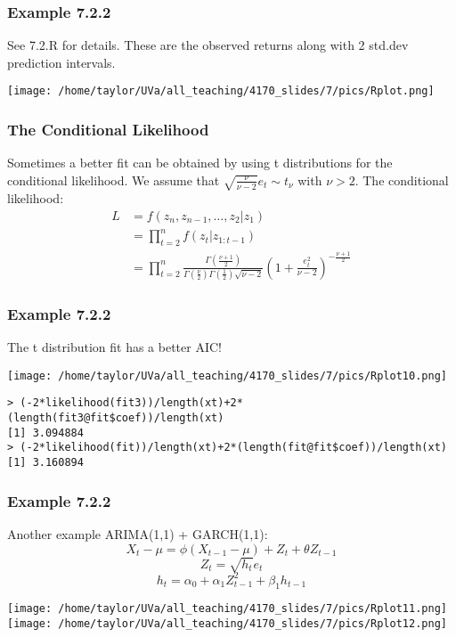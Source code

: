 \documentclass{beamer}
\begin{document}

\begin{frame}[fragile]
\frametitle{Example 7.2.2}

See 7.2.R for details. These are the observed returns along with 2 std.dev prediction intervals.

\texttt{[image: /home/taylor/UVa/all\_teaching/4170\_slides/7/pics/Rplot.png]}


\end{frame}


\begin{frame}
\frametitle{The Conditional Likelihood}

Sometimes a better fit can be obtained by using t distributions for the conditional likelihood. We assume that $\sqrt{\frac{\nu}{\nu - 2}}e_t \sim t_{\nu}$ with $\nu > 2$. The conditional likelihood:
\begin{align*}
L &= f(z_n, z_{n-1},\ldots,z_2 |z_1) \\
&= \prod_{t=2}^n f(z_t|z_{1:t-1}) \\
&= \prod_{t=2}^n \frac{\Gamma(\frac{\nu+1}{2}) }{\Gamma(\frac{\nu}{2})\Gamma(\frac{1}{2})\sqrt{\nu-2} } \left(1 +\frac{e_t^2 }{\nu-2}  \right)^{- \frac{\nu+1}{2}}
\end{align*}

\end{frame}


\begin{frame}[fragile]
\frametitle{Example 7.2.2}

The t distribution fit has a better AIC!

\texttt{[image: /home/taylor/UVa/all\_teaching/4170\_slides/7/pics/Rplot10.png]}

\begin{verbatim}
> (-2*likelihood(fit3))/length(xt)+2*(length(fit3@fit$coef))/length(xt)
[1] 3.094884
> (-2*likelihood(fit))/length(xt)+2*(length(fit@fit$coef))/length(xt)
[1] 3.160894
\end{verbatim}
\end{frame}


\begin{frame}[fragile]
\frametitle{Example 7.2.2}

Another example ARIMA(1,1) + GARCH(1,1): 
\[
X_t - \mu = \phi(X_{t-1} - \mu) + Z_t + \theta Z_{t-1} 
\]
\[
Z_t = \sqrt{h_{t}}e_t
\]
\[
h_t = \alpha_0 + \alpha_1 Z_{t-1}^2 + \beta_1 h_{t-1}
\]

\texttt{[image: /home/taylor/UVa/all\_teaching/4170\_slides/7/pics/Rplot11.png]}
\texttt{[image: /home/taylor/UVa/all\_teaching/4170\_slides/7/pics/Rplot12.png]}

\end{frame}
\end{document}
